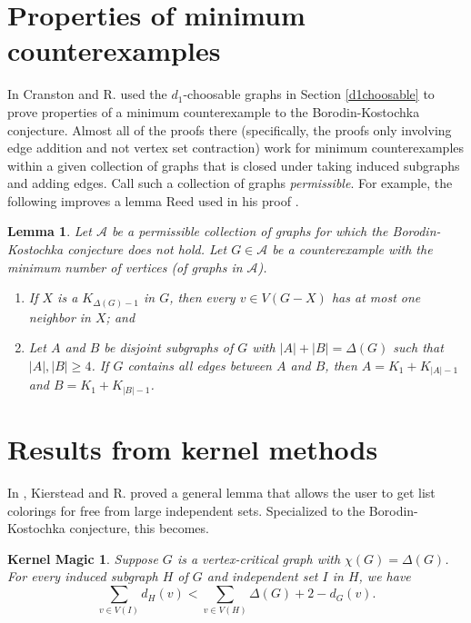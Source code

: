 \documentclass[12pt]{article}
\theoremstyle{plain}
\newtheorem{lem}[thm]{Lemma}
\newtheorem*{KernelMagic}{Kernel Magic}
\theoremstyle{definition}
\theoremstyle{remark}
\newcommand{\fancy}[1]{\mathcal{#1}}
\newcommand{\card}[1]{\left|#1\right|}
\def\A{\fancy{A}}
\begin{document}
\section{Properties of minimum counterexamples}\label{mules}
In \cite{cranstonrabernapriori} Cranston and R. used the $d_1$-choosable graphs in Section \ref{d1choosable} to prove properties 
of a minimum counterexample to the Borodin-Kostochka conjecture.  Almost all of the proofs there (specifically, the proofs only involving edge addition and not vertex set contraction)
work for minimum counterexamples within a given collection of graphs that is closed under taking induced subgraphs and adding edges.  Call such a collection of graphs \emph{permissible}.
For example, the following improves a lemma Reed used in his proof \cite{reed1999strengthening}.

\begin{lem}
Let $\A$ be a permissible collection of graphs for which the Borodin-Kostochka conjecture does not hold.  Let $G \in \A$ be a counterexample with the minimum number of 
vertices (of graphs in $\A$). 
\begin{enumerate}
\item If $X$ is a $K_{\Delta(G) - 1}$ in $G$, then every $v \in V(G-X)$ has at most one neighbor in $X$; and
\item Let $A$ and $B$ be disjoint subgraphs of $G$ with $\card{A} + \card{B} = \Delta(G)$ such that $\card{A},\card{B} \ge 4$.  If $G$ contains all edges between $A$ and $B$,
then $A = K_1 + K_{\card{A} - 1}$ and $B = K_1 + K_{\card{B} - 1}$.
\end{enumerate}

\end{lem}




\section{Results from kernel methods}
In \cite{KernelMagic}, Kierstead and R. proved a general lemma that allows the user to get list colorings for free from large independent sets.  
Specialized to the Borodin-Kostochka conjecture,
this becomes.

\begin{KernelMagic}
Suppose $G$ is a vertex-critical graph with $\chi(G) = \Delta(G)$.  For every induced subgraph $H$ of $G$ and independent set $I$ in $H$, we have
\[\sum_{v \in V(I)} d_H(v) < \sum_{v \in V(H)} \Delta(G) + 2 - d_G(v).\]
\end{KernelMagic}
\end{document}
